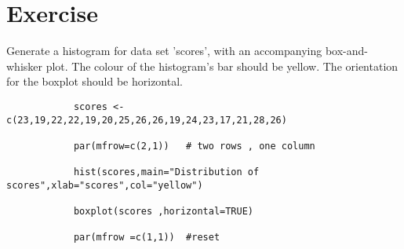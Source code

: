 			

			
			\section{Exercise}
			
			Generate a histogram for data set 'scores', with an accompanying box-and-whisker plot.
			The colour of the histogram's bar should be yellow. The orientation for the boxplot should be horizontal.
			
			\begin{verbatim}
			scores <-c(23,19,22,22,19,20,25,26,26,19,24,23,17,21,28,26)
			
			par(mfrow=c(2,1)) 	# two rows , one column
			
			hist(scores,main="Distribution of scores",xlab="scores",col="yellow")
			
			boxplot(scores ,horizontal=TRUE)
			
			par(mfrow =c(1,1)) 	#reset
			\end{verbatim}
